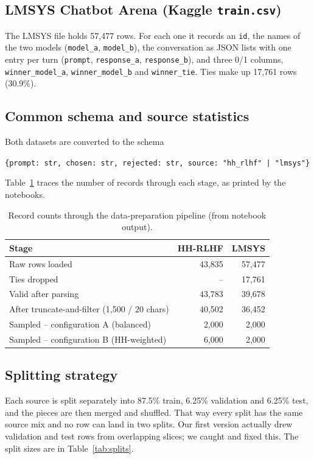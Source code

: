 \subsection{LMSYS Chatbot Arena (Kaggle \texttt{train.csv})}
The LMSYS file holds 57,477 rows. For each one it records an \texttt{id}, the names of the two models (\texttt{model\_a}, \texttt{model\_b}), the conversation as JSON lists with one entry per turn (\texttt{prompt}, \texttt{response\_a}, \texttt{response\_b}), and three 0/1 columns, \texttt{winner\_model\_a}, \texttt{winner\_model\_b} and \texttt{winner\_tie}. Ties make up 17,761 rows (30.9\%).

\subsection{Common schema and source statistics}
Both datasets are converted to the schema
\begin{center}
\texttt{\{prompt: str, chosen: str, rejected: str, source: "hh\_rlhf" | "lmsys"\}}
\end{center}
Table~\ref{tab:datastats} traces the number of records through each stage, as printed by the notebooks.

\begin{table}[!htbp]
\centering
\caption[Record counts through data preparation]{Record counts through the data-preparation pipeline (from notebook output).}
\label{tab:datastats}
\small
\begin{tabular}{@{}lrr@{}}
\toprule
\textbf{Stage} & \textbf{HH-RLHF} & \textbf{LMSYS}\\
\midrule
Raw rows loaded & 43,835 & 57,477\\
Ties dropped & -- & 17,761\\
Valid after parsing & 43,783 & 39,678\\
After truncate-and-filter (1,500 / 20 chars) & 40,502 & 36,452\\
\midrule
Sampled -- configuration A (balanced) & 2,000 & 2,000\\
Sampled -- configuration B (HH-weighted) & 6,000 & 2,000\\
\bottomrule
\end{tabular}
\end{table}

\subsection{Splitting strategy}
Each source is split separately into 87.5\% train, 6.25\% validation and 6.25\% test, and the pieces are then merged and shuffled. That way every split has the same source mix and no row can land in two splits. Our first version actually drew validation and test rows from overlapping slices; we caught and fixed this. The split sizes are in Table~\ref{tab:splits}.

